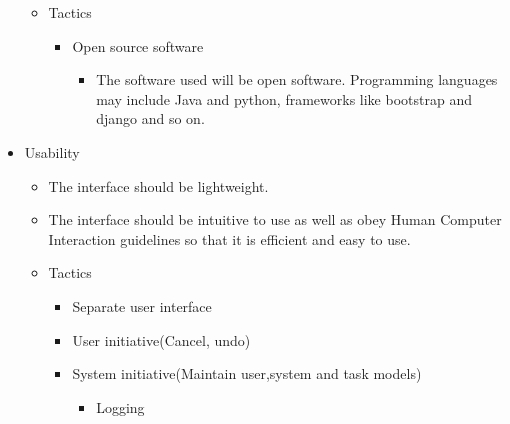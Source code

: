 \documentclass[a4paper,12pt]{article}
\begin{document}
\begin{itemize}
\begin{itemize}
			\item Tactics
			\begin{itemize}
				\item Open source software
					\begin{itemize}
						\item The software used will be open software. Programming languages may include Java and python, frameworks like bootstrap and django and so on. 
					\end{itemize}
			\end{itemize}			
			
		\end{itemize}
		\item Usability
		\begin{itemize}
			\item The interface should be lightweight.
			\item The interface should be intuitive to use as well as obey Human Computer Interaction guidelines so that it is efficient and easy to use.
			
			\item Tactics
			\begin{itemize}
				\item Separate user interface
				\item User initiative(Cancel, undo)
				\item System initiative(Maintain user,system and task models)
					\begin{itemize}
						\item Logging
					\end{itemize}
			\end{itemize}			
			
		\end{itemize}
	\end{itemize}
\end{document}
